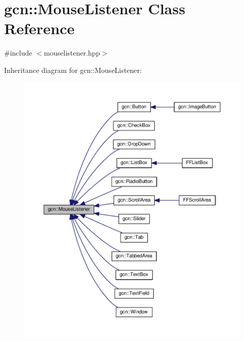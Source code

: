 \hypertarget{classgcn_1_1MouseListener}{}\section{gcn\+:\+:Mouse\+Listener Class Reference}
\label{classgcn_1_1MouseListener}


{\ttfamily \#include $<$mouselistener.\+hpp$>$}



Inheritance diagram for gcn\+:\+:Mouse\+Listener\+:\nopagebreak
\begin{figure}[H]
\begin{center}
\leavevmode
\includegraphics[width=350pt]{classgcn_1_1MouseListener__inherit__graph}
\end{center}
\end{figure}
